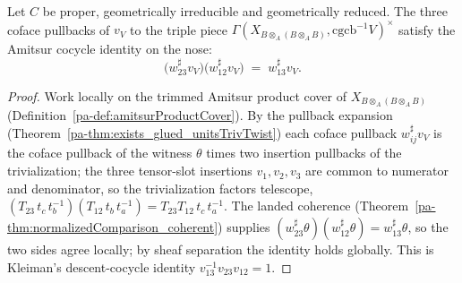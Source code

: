 \begin{theorem}
  \label{pa-thm:pieceComparisonUnit_coherent}
  \leanok

  Let \(C\) be proper, geometrically irreducible and geometrically reduced. The three coface
  pullbacks of \(v_V\) to the triple piece \(\Gamma(X_{B \otimes_A (B \otimes_A B)},
  \mathrm{cgcb}^{-1}V)^{\times}\) satisfy the Amitsur cocycle identity on the nose:
  \[
    \bigl(w_{23}^{\sharp}v_V\bigr)\bigl(w_{12}^{\sharp}v_V\bigr) \;=\; w_{13}^{\sharp}v_V .
  \]
\end{theorem}
\begin{proof}
  \leanok
  Work locally on the trimmed Amitsur product cover of \(X_{B \otimes_A (B \otimes_A B)}\)
  (Definition~\ref{pa-def:amitsurProductCover}). By the pullback expansion
  (Theorem~\ref{pa-thm:exists_glued_unitsTrivTwist}) each coface pullback \(w_{ij}^{\sharp}v_V\) is the
  coface pullback of the witness \(\theta\) times two insertion pullbacks of the trivialization; the
  three tensor-slot insertions \(v_1, v_2, v_3\) are common to numerator and denominator, so the
  trivialization factors telescope, \((T_{23}\,t_c\,t_b^{-1})(T_{12}\,t_b\,t_a^{-1}) =
  T_{23}T_{12}\,t_c\,t_a^{-1}\). The landed coherence (Theorem~\ref{pa-thm:normalizedComparison_coherent})
  supplies \((w_{23}^{\sharp}\theta)(w_{12}^{\sharp}\theta) = w_{13}^{\sharp}\theta\), so the two
  sides agree locally; by sheaf separation the identity holds globally. This is Kleiman's
  descent-cocycle identity \(v_{13}^{-1}v_{23}v_{12} = 1\).
\end{proof}

